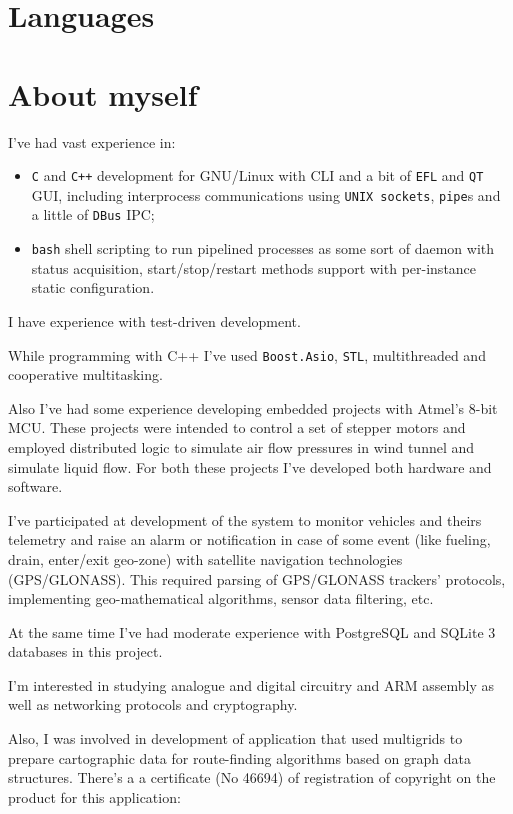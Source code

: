 \documentclass[11pt,a4paper,russian]{moderncv}
\begin{document}
\section{Languages}

\section{About myself}
\par{I've had vast experience in:}
\begin{itemize}
\item \texttt{C} and \texttt{C++} development for GNU/Linux with CLI and a bit of \texttt{EFL} and \texttt{QT} GUI, including interprocess communications using \texttt{UNIX sockets}, \texttt{pipe}s and a little of \texttt{DBus} IPC;
\item \texttt{bash} shell scripting to run pipelined processes as some sort of daemon with status acquisition, start/stop/restart methods support with per-instance static configuration.
\end{itemize}
\par{I have experience with test-driven development.}
\par{While programming with C++ I've used \texttt{Boost.Asio}, \texttt{STL}, multithreaded and cooperative multitasking.}
\par{Also I've had some experience developing embedded projects with Atmel's 8-bit MCU. These projects were intended to control a set of stepper motors and employed distributed logic to simulate air flow pressures in wind tunnel and simulate liquid flow. For both these projects I've developed both hardware and software.}
\par{I've participated at development of the system to monitor vehicles and theirs telemetry and raise an alarm or notification in case of some event (like fueling, drain, enter/exit geo-zone) with satellite navigation technologies (GPS/GLONASS). This required parsing of GPS/GLONASS trackers' protocols, implementing geo-mathematical algorithms, sensor data filtering, etc.}
\par{At the same time I've had moderate experience with PostgreSQL and SQLite 3 databases in this project.}
\par{I'm interested in studying analogue and digital circuitry and ARM assembly as well as networking protocols and cryptography.}
\par{Also, I was involved in development of application that used multigrids to prepare cartographic data for route-finding algorithms based on graph data structures. There's a a certificate (No 46694) of registration of copyright on the product for this application}:
\end{document}
